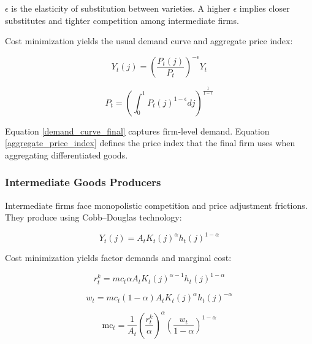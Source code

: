 \documentclass[11pt,preprint]{elsarticle}
\numberwithin{equation}{section}
\numberwithin{figure}{section}
\numberwithin{table}{section}
\begin{document}
\(\epsilon\) is the elasticity of substitution between varieties. A
higher \(\epsilon\) implies closer substitutes and tighter competition
among intermediate firms.

Cost minimization yields the usual demand curve and aggregate price
index:

\begin{equation}  
Y_t(j) = \left( \frac{P_t(j)}{P_t} \right)^{-\epsilon} Y_t  
\label{demand_curve_final}  
\end{equation}

\begin{equation}  
P_t = \left( \int_0^1 P_t(j)^{1-\epsilon}  dj \right)^{\frac{1}{1-\epsilon}}  
\label{aggregate_price_index}  
\end{equation}

Equation \eqref{demand_curve_final} captures firm-level demand. Equation
\eqref{aggregate_price_index} defines the price index that the final
firm uses when aggregating differentiated goods.

\subsubsection{Intermediate Goods
Producers}\label{intermediate-goods-producers}

Intermediate firms face monopolistic competition and price adjustment
frictions. They produce using Cobb--Douglas technology:

\begin{equation}
Y_t(j) = A_t K_t(j)^{\alpha} h_t(j)^{1-\alpha}
\label{intermediate_production}
\end{equation}

Cost minimization yields factor demands and marginal cost:

\begin{equation}
r_t^k =m c_t \alpha A_t K_t(j)^{\alpha-1} h_t(j)^{1-\alpha}
\label{Capital_Demand_Condition}
\end{equation}

\begin{equation}
w_t = mc_t (1-\alpha) A_t K_t(j)^{\alpha} h_t(j)^{-\alpha}
\label{Labour_Demand_Condition}
\end{equation}

\begin{equation}
\text{mc}_t = \frac{1}{A_t} \left( \frac{r_t^k}{\alpha} \right)^{\alpha} \left( \frac{w_t}{1-\alpha} \right)^{1-\alpha}
\label{marginal_cost}
\end{equation}
\end{document}
